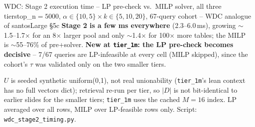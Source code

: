 \documentclass[aspectratio=169,10pt]{beamer}
\newcommand{\highlight}[1]{{\color{Cat1}\bfseries #1}}
\begin{document}
\begin{frame}{WDC: Stage 2 execution time -- LP pre-check vs.\ MILP solver, all three tiers}{top\_n$=5000$, $\alpha\in\{10,5\}\times k\in\{5,10,20\}$, 67-query cohort -- WDC analogue of santosLarge \S5c}
\vspace{3pt}
\footnotesize
\highlight{Stage 2 is a few ms everywhere} (2.3--6.0\,ms), growing $\sim$1.5--1.7$\times$ for an 8$\times$ larger pool and only $\sim$1.4$\times$ for 100$\times$ more tables; the MILP is $\sim$55--76\% of pre+solver. \highlight{New at \texttt{tier\_1m}: the LP pre-check becomes decisive} -- 7/67 queries are LP-infeasible at every cell (MILP skipped), since the cohort's $\tau$ was validated only on the two smaller tiers.

\vspace{1pt}
{\footnotesize\color{Muted} $U$ is seeded synthetic uniform(0,1), not real unionability (\texttt{tier\_1m}'s lean context has no full vectors dict); retrieval re-run per tier, so $|D|$ is not bit-identical to earlier slides for the smaller tiers; \texttt{tier\_1m} uses the cached $M{=}16$ index. LP averaged over all rows, MILP over LP-feasible rows only. Script: \texttt{wdc\_stage2\_timing.py}.}
\end{frame}
\end{document}
